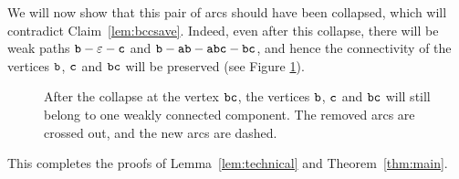 We will now show that this pair of arcs should have been collapsed, which will contradict Claim~\ref{lem:bccsave}.
Indeed, even after this collapse, there will be weak paths $ {\tt b} - \varepsilon - {\tt c} $ and $ {\tt b} - {\tt ab} - {\tt abc} - {\tt bc} $, and hence the connectivity of the vertices $ {\tt b} $, $ {\tt c} $ and $ {\tt bc} $ will be preserved (see Figure \ref{fig:lvl1final}).
\begin{figure}[ht]
\begin{center}

\end{center}

\caption{After the collapse at the vertex $ {\tt bc} $, the vertices $ {\tt b} $, $ {\tt c} $ and $ {\tt bc} $ will still belong to one weakly connected component. The removed arcs are crossed out, and the new arcs are dashed.}\label{fig:lvl1final}
\end{figure}

This completes the proofs of Lemma~\ref{lem:technical} and Theorem~\ref{thm:main}.